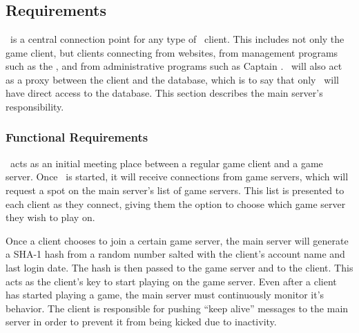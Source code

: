 %

\chapter{\MainServer}
\label{mainserver}

\section{Requirements}

\MainServer\ is a central connection point for any type of \VTank\ client. This includes not only the game client, but clients connecting from websites, from management programs such as the \Janitor, and from administrative programs such as Captain \VTank. \MainServer\ will also act as a proxy between the client and the database, which is to say that only \MainServer\ will have direct access to the database. This section describes the main server's responsibility.

\subsection{Functional Requirements}

\MainServer\ acts as an initial meeting place between a regular game client and a game server. Once \MainServer\ is started, it will receive connections from game servers, which will request a spot on the main server's list of game servers. This list is presented to each client as they connect, giving them the option to choose which game server they wish to play on.

Once a client chooses to join a certain game server, the main server will generate a SHA-1 hash from a random number salted with the client's account name and last login date. The hash is then passed to the game server and to the client. This acts as the client's key to start playing on the game server. Even after a client has started playing a game, the main server must continuously monitor it's behavior. The client is responsible for pushing ``keep alive'' messages to the main server in order to prevent it from being kicked due to inactivity.

